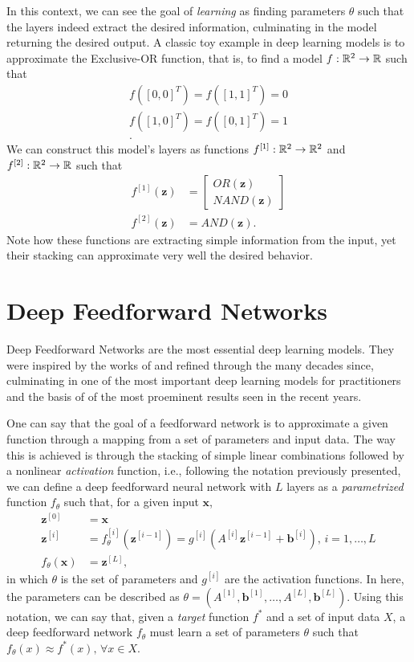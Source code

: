 In this context, we can see the goal of \textit{learning} as finding parameters $\theta$ such that the layers indeed extract the desired information, culminating in the model returning the desired output.
A classic toy example in deep learning models is to approximate the Exclusive-OR function, that is, to find a model $f : \mathbb{R}^2 \to \mathbb{R}$ such that
\begin{align*}
    f([0,0]^T) = f([1,1]^T) = 0 \\
    f([1,0]^T) = f([0,1]^T) = 1 \\
.\end{align*}
We can construct this model's layers as functions $f^{[1]}:\mathbb{R}^2\to\mathbb{R}^2$ and $f^{[2]}:\mathbb{R}^2\to\mathbb{R}$ such that
\begin{align*}
    f^{[1]}(\bm{z}) &= \begin{bmatrix}
    OR(\bm{z}) \\
    NAND(\bm{z})
    \end{bmatrix} \\
    f^{[2]}(\bm{z}) &= AND(\bm{z})
.\end{align*}
Note how these functions are extracting simple information from the input, yet their stacking can approximate very well the desired behavior.

\section{Deep Feedforward Networks}

Deep Feedforward Networks are the most essential deep learning models.
They were inspired by the works of \textcite{rosenblatt_perceptron_1957} and refined through the many decades since, culminating in one of the most important deep learning models for practitioners and the basis of of the most proeminent results seen in the recent years\cite{goodfellow_deep_2016}.

One can say that the goal of a feedforward network is to approximate a given function through a mapping from a set of parameters and input data.
The way this is achieved is through the stacking of simple linear combinations followed by a nonlinear \textit{activation} function, i.e., following the notation previously presented, we can define a deep feedforward neural network with $L$ layers as a \textit{parametrized} function $f_\theta$ such that, for a given input $\bm{x}$,
\begin{align*}
    \bm{z}^{[0]} &= \bm{x} \\
    \bm{z}^{[i]} &= f_\theta^{[i]}(\bm{z}^{[i-1]}) = g^{[i]}\left(A^{[i]}\bm{z}^{[i-1]} + \bm{b}^{[i]}\right) ,\,i=1,\ldots,L \\
    f_\theta(\bm{x}) &= \bm{z}^{[L]}
,\end{align*}
in which $\theta$ is the set of parameters and $g^{[i]}$ are the activation functions. In here, the parameters can be described as $\theta = \left(A^{[1]},\bm{b}^{[1]},\ldots,A^{[L]},\bm{b}^{[L]}\right)$. Using this notation, we can say that, given a \textit{target} function $f^*$ and a set of input data $X$, a deep feedforward network $f_\theta$ must learn a set of parameters $\theta$ such that $f_\theta(x) \approx f^*(x),\,\forall x \in X$.

